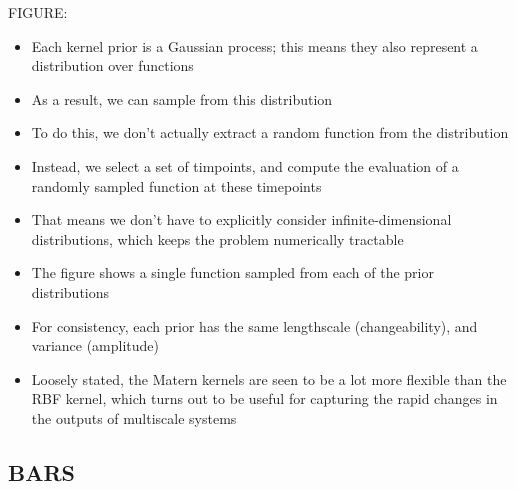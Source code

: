 \documentclass[11pt]{article}
\begin{document}
FIGURE:
\begin{itemize}
\item Each kernel prior is a Gaussian process; this means they also represent a distribution over functions
\item As a result, we can sample from this distribution
\item To do this, we don't actually extract a random function from the distribution
\item Instead, we select a set of timpoints, and compute the evaluation of a randomly sampled function at these timepoints
\item That means we don't have to explicitly consider infinite-dimensional distributions, which keeps the problem numerically tractable
\item The figure shows a single function sampled from each of the prior distributions
\item For consistency, each prior has the same lengthscale (changeability), and variance (amplitude)
\item Loosely stated, the Matern kernels are seen to be a lot more flexible than the RBF kernel, which turns out to be useful for capturing the rapid changes in the outputs of multiscale systems
\end{itemize}

\subsection{BARS}
\label{sec:org231e417}
\end{document}
